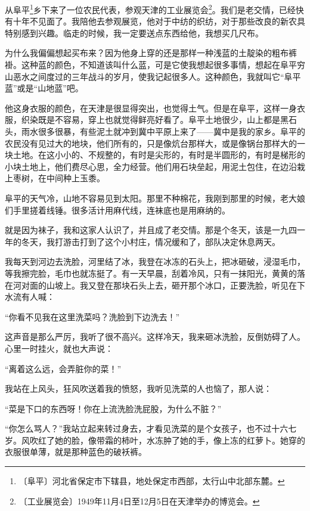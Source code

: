 \documentclass[12pt,UTF-8,openany]{ctexbook}
\begin{document}
\begin{large}
    
    从阜平\footnote{〔阜平〕河北省保定市下辖县，地处保定市西部，太行山中北部东麓。}乡下来了一位农民代表，参观天津的工业展览会\footnote{〔工业展览会〕1949年11月4日至12月5日在天津举办的博览会。}。我们是老交情，已经快有十年不见面了。我陪他去参观展览，他对于中纺的织纺，对于那些改良的新农具特别感到兴趣。临走的时候，我一定要送点东西给他，我想买几尺布。
    
    为什么我偏偏想起买布来？因为他身上穿的还是那样一种浅蓝的土靛染的粗布裤褂。这种蓝的颜色，不知道该叫什么蓝，可是它使我想起很多事情，想起在阜平穷山恶水之间度过的三年战斗的岁月，使我记起很多人。这种颜色，我就叫它“阜平蓝”或是“山地蓝”吧。
    
    他这身衣服的颜色，在天津是很显得突出，也觉得土气。但是在阜平，这样一身衣服，织染既是不容易，穿上也就觉得鲜亮好看了。阜平土地很少，山上都是黑石头，雨水很多很暴，有些泥土就冲到冀中平原上来了——冀中是我的家乡。阜平的农民没有见过大的地块，他们所有的，只是像炕台那样大，或是像锅台那样大的一块土地。在这小小的、不规整的，有时是尖形的，有时是半圆形的，有时是梯形的小块土地上，他们费尽心思，全力经营。他们用石块垒起，用泥土包住，在边沿栽上枣树，在中间种上玉黍。
    
    阜平的天气冷，山地不容易见到太阳。那里不种棉花，我刚到那里的时候，老大娘们手里搓着线锤。很多活计用麻代线，连袜底也是用麻纳的。
    
    就是因为袜子，我和这家人认识了，并且成了老交情。那是个冬天，该是一九四一年的冬天，我打游击打到了这个小村庄，情况缓和了，部队决定休息两天。
    
    我每天到河边去洗脸，河里结了冰，我登在冰冻的石头上，把冰砸破，浸湿毛巾，等我擦完脸，毛巾也就冻挺了。有一天早晨，刮着冷风，只有一抹阳光，黄黄的落在河对面的山坡上。我又登在那块石头上去，砸开那个冰口，正要洗脸，听见在下水流有人喊：
    
    “你看不见我在这里洗菜吗？洗脸到下边洗去！”
    
    这声音是那么严厉，我听了很不高兴。这样冷天，我来砸冰洗脸，反倒妨碍了人。心里一时挂火，就也大声说：
    
    “离着这么远，会弄脏你的菜！”
    
    我站在上风头，狂风吹送着我的愤怒，我听见洗菜的人也恼了，那人说：
    
    “菜是下口的东西呀！你在上流洗脸洗屁股，为什么不脏？”
    
    “你怎么骂人？”我站立起来转过身去，才看见洗菜的是个女孩子，也不过十六七岁。风吹红了她的脸，像带霜的柿叶，水冻肿了她的手，像上冻的红萝卜。她穿的衣服很单薄，就是那种蓝色的破袄裤。
    

\end{large}
\end{document}
